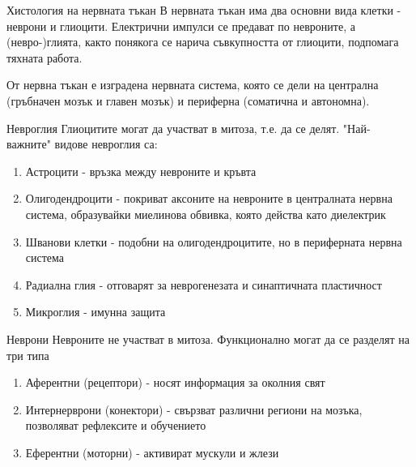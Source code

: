 \begin{frame}[t]{Хистология на нервната тъкан}
    В нервната тъкан има два основни вида клетки - неврони и глиоцити.
    Електрични импулси се предават по невроните, а (невро-)глията, 
    както понякога се нарича съвкупността от глиоцити, подпомага тяхната работа.

    От нервна тъкан е изградена нервната система, която се дели на централна (гръбначен мозък и главен мозък) и периферна (соматична и автономна).

\end{frame}

\begin{frame}[t]{Невроглия}
    Глиоцитите могат да участват в митоза, т.е. да се делят. "Най-важните" видове невроглия са:
    \begin{enumerate}
        \item Астроцити - връзка между невроните и кръвта
        \item Олигодендроцити - покриват аксоните на невроните в централната нервна система, образувайки миелинова обвивка, която действа като диелектрик
        \item Шванови клетки - подобни на олигодендроцитите, но в периферната нервна система
        \item Радиална глия - отговарят за неврогенезата и синаптичната пластичност
        \item Микроглия - имунна защита
    \end{enumerate}
\end{frame}

\begin{frame}[t]{Неврони}
    Невроните не участват в митоза. Функционално могат да се разделят на три типа
    \begin{enumerate}
        \item Аферентни (рецептори) - носят информация за околния свят 
        \item Интернерврони (конектори) - свързват различни региони на мозъка, позволяват рефлексите и обучението 
        \item Еферентни (моторни) - активират мускули и жлези
    \end{enumerate}
\end{frame}

